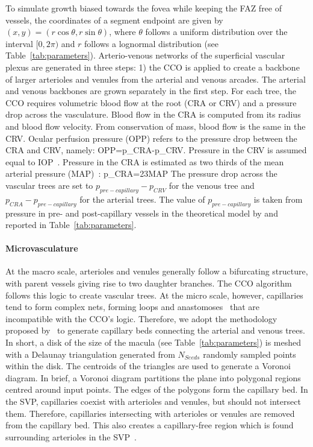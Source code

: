 \documentclass[11pt,]{article}
\let\oldequation\equation
\let\oldendequation\endequation
\renewenvironment{equation}
  {\linenomathNonumbers\oldequation}
  {\oldendequation\endlinenomath}
\begin{document}
To simulate growth biased towards the fovea while keeping the FAZ free
of vessels, the coordinates of a segment endpoint are given by
$(x,y)=(r\cos\theta, r\sin\theta)$, where $\theta$ follows a uniform
distribution over the interval $[0,2\pi)$ and $r$ follows a lognormal
distribution (see Table~\ref{tab:parameters}). Arterio-venous
networks of the superficial vascular plexus are generated in three
steps: 1) the CCO is applied to create a backbone of larger arterioles
and venules from the arterial and venous arcades. The arterial and
venous backbones are grown separately in the first step. For each
tree, the CCO requires volumetric blood flow at the root (CRA or CRV)
and a pressure drop across the vasculature. Blood flow in the CRA is
computed from its radius and blood flow velocity. From conservation of
mass, blood flow is the same in the CRV.
Ocular perfusion pressure (OPP) refers to the pressure drop between the CRA and CRV, namely:
\begin{equation}
OPP=p_{CRA}-p_{CRV}.\label{eq:OPP}
\end{equation}
Pressure in the CRV is assumed equal to IOP~\cite{Arciero2013,Guidoboni2014,Zheng2010}.
Pressure in the CRA is estimated as two thirds of the mean arterial pressure (MAP)~\cite{Arciero2013,Guidoboni2014,Zheng2010}:
\begin{equation}
p_{CRA}=\frac23MAP\label{eq:pCRA}
\end{equation}
The pressure drop across the vascular trees are set to
$p_{pre-capillary}-p_{CRV}$ for the venous tree and
$p_{CRA}-p_{pre-capillary}$ for the arterial trees. The value of
$p_{pre-capillary}$ is taken from pressure in pre- and post-capillary vessels in
the theoretical model by \citet{Takahashi2009} and reported in
Table~\ref{tab:parameters}.

\paragraph{Microvasculature}\label{sec:microvasculature} At the macro
scale, arterioles and venules generally follow a bifurcating
structure, with parent vessels giving rise to two daughter
branches. The CCO algorithm follows this logic to create vascular
trees.  At the micro scale, however, capillaries tend to form complex
nets, forming loops and anastomoses~\cite{An2020} that are
incompatible with the CCO’s logic.
Therefore, we adopt the methodology proposed by~\citet{Linninger2013} to generate capillary beds connecting
the arterial and venous trees.
In short, a disk of the size of the macula (see Table~\ref{tab:parameters}) is meshed with a Delaunay
triangulation generated from $N_{Seeds}$ randomly sampled points
within the disk.
The centroids of the triangles are used to generate a Voronoi diagram.
In brief, a Voronoi diagram partitions the plane into polygonal regions centred around input points. 
The edges of the polygons form the capillary bed.
In the SVP, capillaries coexist with arterioles and venules, but should not intersect them.
Therefore, capillaries intersecting with arterioles or venules are removed from the capillary bed.
This also creates a capillary-free region which is found surrounding arterioles in the SVP~\cite{An2020}.
\end{document}
